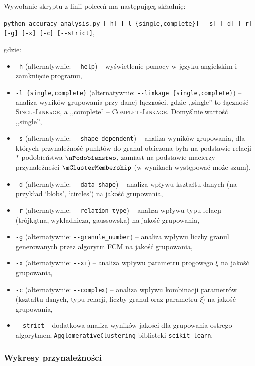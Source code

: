 \documentclass[a4paper,twoside,12pt]{book}
\newcommand{\dataset}[1]{`#1'}
\newcommand{\blobs}{\dataset{blobs}}
\newcommand{\circles}{\dataset{circles}}
\newcommand{\procedura}[1]{\textsc{#1}}
\newcommand{\SingleLinkage}{\procedura{Si\-ng\-le\-Lin\-ka\-ge}}
\newcommand{\CompleteLinkage}{\procedura{Com\-ple\-te\-Lin\-ka\-ge}}
\begin{document}
\begin{appendices}
Wywołanie skryptu z linii poleceń ma następującą składnię:

\lstinline|python accuracy_analysis.py [-h] [-l {single,complete}] [-s] [-d] [-r] [-g] [-x] [-c] [--strict]|,

\noindent gdzie:

\begin{itemize}
	\item \lstinline|-h| (alternatywnie: \lstinline|--help|) -- wyświetlenie pomocy w języku angielskim i zamknięcie programu,
	\item \lstinline|-l {single,complete}| (alternatywnie: \lstinline|--linkage {single,complete}|) -- analiza wyników grupowania przy danej łączności, gdzie ,,single'' to łączność \SingleLinkage{}, a ,,complete'' -- \CompleteLinkage{}. Domyślnie wartość ,,single'',
	\item \lstinline|-s| (alternatywnie: \lstinline|--shape_dependent|) -- analiza wyników grupowania, dla których przynależność punktów do granul obliczona była na podstawie relacji $\ast$-po\-dob\-ień\-st\-wa $\nPodobienstwo$, zamiast na podstawie macierzy przynależności $\mClusterMembership$ (w wynikach występować może szum),
	\item \lstinline|-d| (alternatywnie: \lstinline|--data_shape|) -- analiza wpływu kształtu danych (na przykład \blobs{}, \circles{}) na jakość grupowania,
	\item \lstinline|-r| (alternatywnie: \lstinline|--relation_type|) -- analiza wpływu typu relacji (trójkątna, wykładnicza, gaussowska) na jakość grupowania,
	\item \lstinline|-g| (alternatywnie: \lstinline|--granule_number|) -- analiza wpływu liczby granul generowanych przez algorytm FCM na jakość grupowania,
	\item \lstinline|-x| (alternatywnie: \lstinline|--xi|) -- analiza wpływu parametru progowego $\xi$ na jakość grupowania,
	\item \lstinline|-c| (alternatywnie: \lstinline|--complex|) -- analiza wpływu kombinacji parametrów (kształtu danych, typu relacji, liczby granul oraz parametru $\xi$) na jakość grupowania,
	\item \lstinline|--strict| -- dodatkowa analiza wyników jakości dla grupowania ostrego algorytmem \texttt{Ag\-glo\-me\-ra\-ti\-ve\-Clu\-s\-te\-ring} biblioteki \texttt{scikit-learn}.
\end{itemize}

\subsubsection*{Wykresy przynależności}


\end{appendices}
\end{document}
